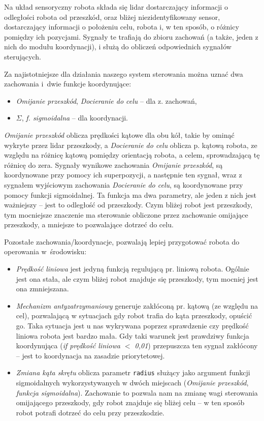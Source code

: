\documentclass[11pt]{article}
\begin{document}
Na układ sensoryczny robota składa się lidar dostarczający informacji o odległości robota od przeszkód, oraz bliżej niezidentyfikowany sensor, dostarczający informacji o położeniu celu, robota i, w ten sposób, o różnicy pomiędzy ich pozycjami. Sygnały te trafiają do zbioru zachowań (a także, jeden z nich do modułu koordynacji), i służą do obliczeń odpowiednich sygnałów sterujących.

Za najistotniejsze dla działania naszego system sterowania można uznać dwa zachowania i~dwie funkcje koordynujące:
\begin{itemize}[--]
\item \emph{Omijanie przeszkód}, \emph{Docieranie do celu} -- dla z. zachowań,
\item \emph{$\Sigma$}, \emph{f. sigmoidalna} -- dla koordynacji.
\end{itemize}

\emph{Omijanie przeszkód} oblicza prędkości kątowe dla obu kół, takie by ominąć wykryte przez lidar przeszkody, a \emph{Docieranie do celu} oblicza p. kątową robota, ze względu na różnicę kątową pomiędzy orientacją robota, a celem, sprowadzającą tę różnicę do zera. Sygnały wynikowe zachowania \emph{Omijanie przeszkód}, są koordynowane przy pomocy ich superpozycji, a następnie ten sygnał, wraz z sygnałem wyjściowym zachowania \emph{Docieranie do celu}, są koordynowane przy pomocy funkcji sigmoidalnej. Ta funkcja ma dwa parametry, ale jeden z nich jest ważniejszy -- jest to odległość od przeszkody. Czym bliżej robot jest przeszkody, tym mocniejsze znaczenie ma sterowanie obliczone przez zachowanie omijające przeszkody, a mniejsze to pozwalające dotrzeć do celu.

Pozostałe zachowania/koordynacje, pozwalają lepiej przygotować robota do operowania w~środowisku:
\begin{itemize}[--]
\item \emph{Prędkość liniowa} jest jedyną funkcją regulującą pr. liniową robota. Ogólnie jest ona stała, ale czym bliżej robot znajduje się przeszkody, tym mocniej jest ona zmniejszana.
\item \emph{Mechanizm antyzatrzymaniowy} generuje zakłóconą pr. kątową (ze względu na cel), pozwalającą w sytuacjach gdy robot trafia do kąta przeszkody, opuścić go. Taka sytuacja jest u nas wykrywana poprzez sprawdzenie czy prędkość liniowa robota jest bardzo mała. Gdy taki warunek jest prawdziwy funkcja koordynująca (\emph{if prędkość liniowa $<$ 0,01}) przepuszcza ten sygnał zakłócony -- jest to koordynacja na zasadzie priorytetowej.
\item \emph{Zmiana kąta skrętu} oblicza parametr \texttt{radius} służący jako argument funkcji sigmoidalnych wykorzystywanych w dwóch miejscach (\emph{Omijanie przeszkód}, \emph{funkcja sigmoidalna}). Zachowanie to pozwala nam na zmianę wagi sterowania omijającego przeszkody, gdy robot znajduje się bliżej celu -- w ten sposób robot potrafi dotrzeć do celu przy przeszkodzie.
\end{itemize}
\end{document}
